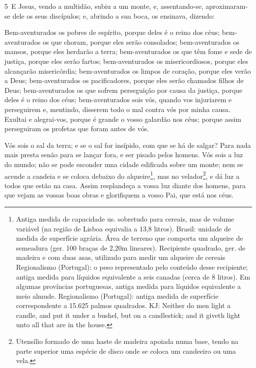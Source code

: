 \medskip

\lettrine{5}\ E Jesus, vendo a multidão, subiu a um monte, e,
assentando-se, aproximaram-se dele os seus discípulos; e,
abrindo a sua boca, os ensinava, dizendo:

Bem-aventurados os pobres de espírito, porque deles é o reino dos
céus; bem-aventurados os que choram, porque eles serão
consolados; bem-aventurados os mansos, porque eles herdarão a
terra; bem-aventurados os que têm fome e sede de justiça, porque
eles serão fartos; bem-aventurados os misericordiosos, porque
eles alcançarão misericórdia; bem-aventurados os limpos de
coração, porque eles verão a Deus; bem-aventurados os
pacificadores, porque eles serão chamados filhos de Deus;
bem-aventurados os que sofrem perseguição por causa da
justiça, porque deles é o reino dos céus; bem-aventurados
sois vós, quando vos injuriarem e perseguirem e, mentindo, disserem
todo o mal contra vós por minha causa. Exultai e alegrai-vos,
porque é grande o vosso galardão nos céus; porque assim perseguiram
os profetas que foram antes de vós.

Vós sois o sal da terra; e se o sal for insípido, com que se há
de salgar? Para nada mais presta senão para se lançar fora, e ser
pisado pelos homens. Vós sois a luz do mundo; não se pode
esconder uma cidade edificada sobre um monte; nem se acende a
candeia e se coloca debaixo do alqueire\footnote{Antiga medida de
capacidade us. sobretudo para cereais, mas de volume variável (na
região de Lisboa equivalia a 13,8 litros). Brasil: unidade de medida
de superfície agrária. Área de terreno que comporta um alqueire de
semeadura (ger. 100 braças de 2,20m lineares). Recipiente quadrado,
ger. de madeira e com duas asas, utilizado para medir um alqueire de
cereais Regionalismo (Portugal): o peso representado pelo conteúdo
desse recipiente; antiga medida para líquidos equivalente a seis
canadas (cerca de 8 litros). Em algumas províncias portuguesas,
antiga medida para líquidos equivalente a meio almude. Regionalismo
(Portugal): antiga medida de superfície correspondente a 15.625
palmos quadrados.  KJ: Neither do men light a candle, and put it
under a bushel, but on a candlestick; and it giveth light unto all
that are in the house.}, mas no velador\footnote{Utensílio formado
de uma haste de madeira apoiada numa base, tendo na parte superior
uma espécie de disco onde se coloca um candeeiro ou uma vela.}, e dá
luz a todos que estão na casa. Assim resplandeça a vossa luz
diante dos homens, para que vejam as vossas boas obras e glorifiquem
a vosso Pai, que está nos céus.

